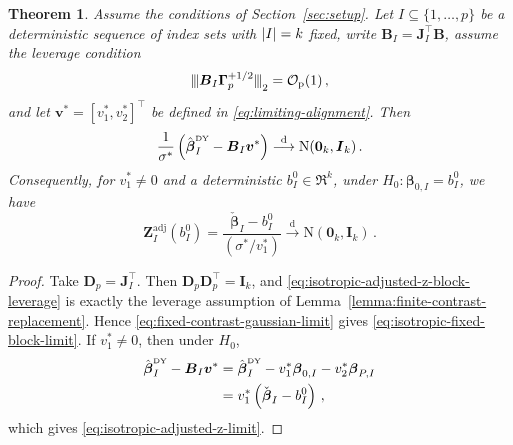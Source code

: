 \documentclass{article}
\makeatletter
\newtheorem{theorem}{Theorem}[section]
\theoremstyle{definition}
\newcommand{\abs}[1]{%
	\ensuremath{%
		\if@display
		\left| #1 \right|
		\else
		\lvert #1 \rvert
		\fi
	}%
}
\newcommand{\mnorms}[1]{{\vert\kern-0.25ex\vert\kern-0.25ex\vert #1
		\vert\kern-0.25ex\vert\kern-0.25ex\vert}}
\newcommand*{\bb}{\boldsymbol}
\newcommand{\betady}{\ensuremath{\hat{\bbeta}^{\textrm{\tiny DY}}}}
\def\bv{\bb{v}}
\def\bbeta{\bb{\beta}}
\makeatother
\begin{document}
\begin{bibunit}
\begingroup
\renewcommand{\thetheorem}{\arabic{theorem}}
\setcounter{theorem}{2}
\begin{theorem}
\label{thm:isotropic-adjusted-z}
Assume the conditions of Section~\ref{sec:setup}. Let
$I\subseteq\{1,\ldots,p\}$ be a deterministic sequence of index sets
with $\abs{I}=k$ fixed, write
$
    \bb B_I
    =
    \bb J_I^\top\bb B
$,
assume the leverage condition
\begin{equation}
\label{eq:isotropic-adjusted-z-block-leverage}
    \mnorms{
        \bb B_I
        \bb\Gamma_p^{+1/2}
    }_2
    =
    \mathcal O_{\mathrm p}(1) \,,
\end{equation}
and let
$\bv^*=[v_1^*,v_2^*]^\top$
be defined in \eqref{eq:limiting-alignment}. Then
\begin{equation}
\label{eq:isotropic-fixed-block-limit}
    \frac1{\sigma^*}
    \left(
        \betady_I-\bb B_I\bv^*
    \right)
    \overset{\mathrm d}{\longrightarrow}
    \mathrm N(\bb0_k,\bb I_k) \,.
\end{equation}
Consequently, for $v_1^* \neq 0$ and a deterministic $b_I^0\in\Re^k$, under
$
    H_0:
    \bbeta_{0,I}=b_I^0 
$, 
we have
\begin{equation}
\label{eq:isotropic-adjusted-z-limit}
    \bb Z_I^{\mathrm{adj}}(b_I^0)
    =
    \frac{\check{\bbeta}_I-b_I^0}{(\sigma^* / v_1^*)}
    \overset{\mathrm d}{\longrightarrow}
    \mathrm N(\bb0_k,\bb I_k) \,.
\end{equation}
\end{theorem}
\endgroup


\begin{proof}
Take $\bb D_p=\bb J_I^\top$. Then
$\bb D_p\bb D_p^\top=\bb I_k$, and
\eqref{eq:isotropic-adjusted-z-block-leverage} is exactly the leverage
assumption of Lemma~\ref{lemma:finite-contrast-replacement}.
Hence \eqref{eq:fixed-contrast-gaussian-limit} gives
\eqref{eq:isotropic-fixed-block-limit}.
If $v_1^*\neq0$, then under $H_0$,
$$
\begin{aligned}
    \betady_I-\bb B_I\bv^*
    &=
    \betady_I
    -
    v_1^*\bbeta_{0,I}
    -
    v_2^*\bbeta_{P,I}
    \\
    &=
    v_1^*
    \left(
        \check{\bbeta}_I-b_I^0
    \right)\,,
\end{aligned}
$$
which gives \eqref{eq:isotropic-adjusted-z-limit}.
\end{proof}



\end{bibunit}
\end{document}
